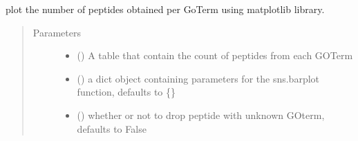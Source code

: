 \documentclass[letterpaper,10pt,english]{sphinxmanual}
\begin{document}
\begin{fulllineitems}
\label{\detokenize{IPTK.Visualization:IPTK.Visualization.vizTools.plot_num_peptide_per_go_term}}
plot the number of peptides obtained per Go\sphinxhyphen{}Term  using matplotlib library.
\begin{quote}\begin{description}
\item[{Parameters}] \leavevmode\begin{itemize}
\item {} 
 () \textendash{} A table that contain the count of peptides from each GO\sphinxhyphen{}Term

\item {} 
 (\sphinxstyleliteralemphasis{\sphinxupquote{{[}}}\sphinxstyleliteralemphasis{\sphinxupquote{,}}\sphinxstyleliteralemphasis{\sphinxupquote{{]}}}\sphinxstyleliteralemphasis{\sphinxupquote{, }}) \textendash{} a dict object containing parameters for the sns.barplot function, defaults to \{\}

\item {} 
 (\sphinxstyleliteralemphasis{\sphinxupquote{, }}) \textendash{} whether or not to drop peptide with unknown GO\sphinxhyphen{}term, defaults to False


\end{itemize}
\end{description}
\end{quote}
\end{fulllineitems}
\end{document}
